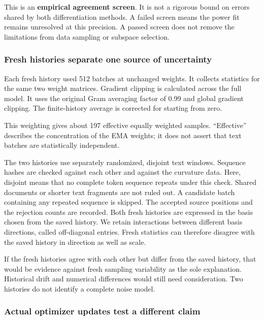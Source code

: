 \documentclass[
  14pt,
  letterpaper,
]{extarticle}
\begin{document}
This is an \textbf{empirical agreement screen}. It is not a rigorous
bound on errors shared by both differentiation methods. A failed screen
means the power fit remains unresolved at this precision. A passed
screen does not remove the limitations from data sampling or subspace
selection.

\subsubsection{Fresh histories separate one source of
uncertainty}\label{fresh-histories-separate-one-source-of-uncertainty}

Each fresh history used 512 batches at unchanged weights. It collects
statistics for the same two weight matrices. Gradient clipping is
calculated across the full model. It uses the original Gram averaging
factor of 0.99 and global gradient clipping. The finite-history average
is corrected for starting from zero.

This weighting gives about 197 effective equally weighted samples.
``Effective'' describes the concentration of the EMA weights; it does
not assert that text batches are statistically independent.

The two histories use separately randomized, disjoint text windows.
Sequence hashes are checked against each other and against the curvature
data. Here, disjoint means that no complete token sequence repeats under
this check. Shared documents or shorter text fragments are not ruled
out. A candidate batch containing any repeated sequence is skipped. The
accepted source positions and the rejection counts are recorded. Both
fresh histories are expressed in the basis chosen from the saved
history. We retain interactions between different basis directions,
called off-diagonal entries. Fresh statistics can therefore disagree
with the saved history in direction as well as scale.

If the fresh histories agree with each other but differ from the saved
history, that would be evidence against fresh sampling variability as
the sole explanation. Historical drift and numerical differences would
still need consideration. Two histories do not identify a complete noise
model.

\subsubsection{Actual optimizer updates test a different
claim}\label{actual-optimizer-updates-test-a-different-claim}
\end{document}
